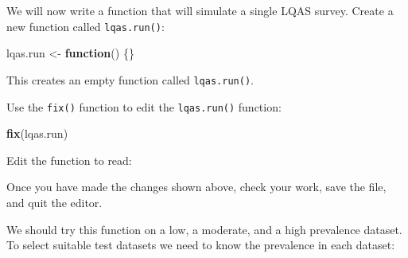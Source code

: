 \documentclass[12pt,a4paper]{book}
\newenvironment{Shaded}{\begin{snugshade}}{\end{snugshade}}
\newcommand{\CharTok}[1]{\textcolor[rgb]{0.31,0.60,0.02}{#1}}
\newcommand{\ControlFlowTok}[1]{\textcolor[rgb]{0.13,0.29,0.53}{\textbf{#1}}}
\newcommand{\DataTypeTok}[1]{\textcolor[rgb]{0.13,0.29,0.53}{#1}}
\newcommand{\KeywordTok}[1]{\textcolor[rgb]{0.13,0.29,0.53}{\textbf{#1}}}
\newcommand{\NormalTok}[1]{#1}
\newcommand{\OperatorTok}[1]{\textcolor[rgb]{0.81,0.36,0.00}{\textbf{#1}}}
\newcommand{\OtherTok}[1]{\textcolor[rgb]{0.56,0.35,0.01}{#1}}
\newcommand{\StringTok}[1]{\textcolor[rgb]{0.31,0.60,0.02}{#1}}
\theoremstyle{definition}
\theoremstyle{definition}
\theoremstyle{definition}
\theoremstyle{remark}
\begin{document}
We will now write a function that will simulate a single LQAS survey.
Create a new function called \texttt{lqas.run()}:

\begin{Shaded}
\begin{Highlighting}[]
\NormalTok{lqas.run <-}\StringTok{ }\ControlFlowTok{function}\NormalTok{() \{\}}
\end{Highlighting}
\end{Shaded}

This creates an empty function called \texttt{lqas.run()}.

Use the \texttt{fix()} function to edit the \texttt{lqas.run()}
function:

\begin{Shaded}
\begin{Highlighting}[]
\KeywordTok{fix}\NormalTok{(lqas.run)}
\end{Highlighting}
\end{Shaded}

Edit the function to read:

Once you have made the changes shown above, check your work, save the
file, and quit the editor.

We should try this function on a low, a moderate, and a high prevalence
dataset. To select suitable test datasets we need to know the prevalence
in each dataset:

\begin{Shaded}
\end{Shaded}
\end{document}
